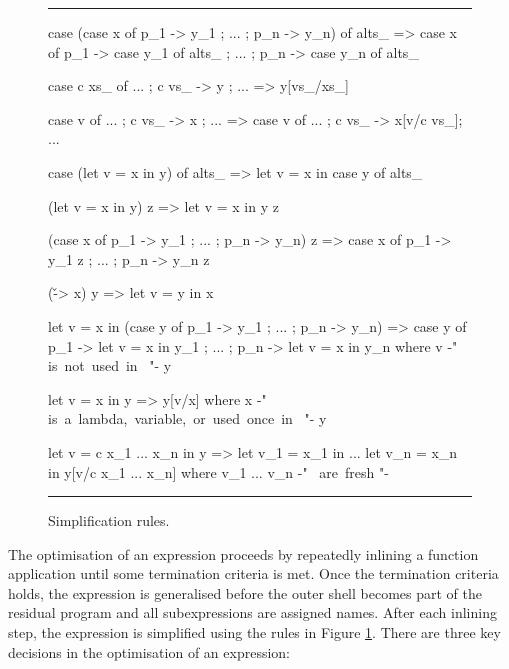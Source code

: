 \documentclass{llncs}
\newenvironment{fig}
    {\begin{figure}[tbp]\hrule}
    {\end{figure}}
\newcommand{\figend}{\hrule}
\begin{document}
\begin{comment}
\begin{fig}
\begin{code}
_O\<case x of alts_  \> =  case _O\<x\> \? of alts_
_O\<let v = x in y   \> =  let v = _O\<x\> \? in _O\<y\>
_O\<x y              \> =  _O\<x\> \? y
_O\<f                \> =  unfold f  , where f {-" \hbox{ is a non-primitive, non-CAF function} "-}
                        =  f         , otherwise
_O\<v                \> =  v
_O\<c                \> =  c
_O\< \v -> x         \> =  \v -> x
\end{code}
\figend
\caption{Optimisation rules.}
\label{fig:optimise}
\end{fig}
\end{comment}

\begin{fig}
\begin{code}
case (case x of {p_1 -> y_1 ; ... ; p_n -> y_n}) of alts_
    => case x of  {  p_1  -> case y_1 of alts_
                  ;  ...
                  ;  p_n  -> case y_n of alts_ }

case c xs_ of {... ; c vs_ -> y ; ...}
    => y[vs_/xs_]

case v of {... ; c vs_ -> x ; ...}
    => case v of {... ; c vs_ -> x[v/c vs_]; ...}

case (let v = x in y) of alts_
    => let v = x in case y of alts_

(let v = x in y) z
    => let v = x in y z

(case x of {p_1 -> y_1 ; ... ; p_n -> y_n}) z
    => case x of {p_1 -> y_1 z ; ... ; p_n -> y_n z}

(\v -> x) y
    => let v = y in x

let v = x in (case y of {p_1 -> y_1 ; ... ; p_n -> y_n})
    => case y of  {  p_1  -> let v = x in y_1
                  ;  ...
                  ;  p_n  -> let v = x in y_n}
    where v {-" \hbox{is not used in } "-} y

let v = x in y
    => y[v/x]
    where x {-" \hbox{is a lambda, variable, or used once in } "-} y

let v = c x_1 ... x_n in y
    =>  let v_1 = x_1 in
        ...
        let v_n = x_n in
        y[v/c x_1 ... x_n]
    where v_1 ... v_n {-" \hbox{ are fresh} "-}
\end{code}
\figend
\caption{Simplification rules.}
\label{fig:simplify}
\end{fig}

The optimisation of an expression proceeds by repeatedly inlining a function application until some termination criteria is met. Once the termination criteria holds, the expression is generalised before the outer shell becomes part of the residual program and all subexpressions are assigned names. After each inlining step, the expression is simplified using the rules in Figure \ref{fig:simplify}. There are three key decisions in the optimisation of an expression:
\end{document}
